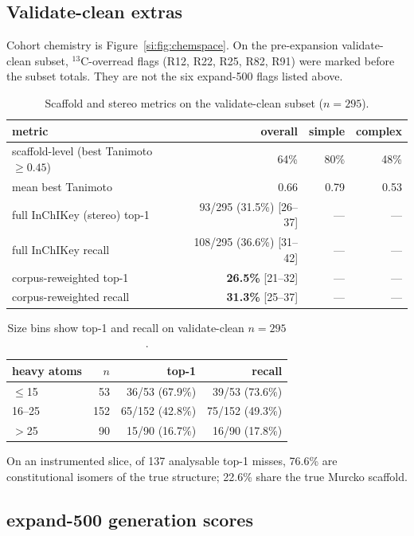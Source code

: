 \subsection{Validate-clean extras}
\label{si:extras}

Cohort chemistry is Figure~\ref{si:fig:chemspace}.
On the pre-expansion validate-clean subset, $^{13}$C-overread flags
(R12, R22, R25, R82, R91) were marked before the subset totals.
They are not the six expand-500 flags listed above.

\begin{table}[ht]
\caption{Scaffold and stereo metrics on the validate-clean subset
($n{=}295$).}
\centering
\small
\begin{tabular}{@{}lrrr@{}}
\toprule
metric & overall & simple & complex \\
\midrule
scaffold-level (best Tanimoto $\geq 0.45$) & 64\% & 80\% & 48\% \\
mean best Tanimoto & 0.66 & 0.79 & 0.53 \\
full InChIKey (stereo) top-1 & 93/295 (31.5\%) [26--37] & --- & --- \\
full InChIKey recall & 108/295 (36.6\%) [31--42] & --- & --- \\
corpus-reweighted top-1 & \textbf{26.5\%} [21--32] & --- & --- \\
corpus-reweighted recall & \textbf{31.3\%} [25--37] & --- & --- \\
\bottomrule
\end{tabular}
\end{table}

\begin{table}[ht]
\caption{Size bins show top-1 and recall on validate-clean $n{=}295$.}
\centering
\begin{tabular}{@{}lrrr@{}}
\toprule
heavy atoms & $n$ & top-1 & recall \\
\midrule
$\leq$15 & 53 & 36/53 (67.9\%) & 39/53 (73.6\%) \\
16--25 & 152 & 65/152 (42.8\%) & 75/152 (49.3\%) \\
$>$25 & 90 & 15/90 (16.7\%) & 16/90 (17.8\%) \\
\bottomrule
\end{tabular}
\end{table}

On an instrumented slice, of 137 analysable top-1 misses, 76.6\% are
constitutional isomers of the true structure; 22.6\% share
the true Murcko scaffold.
\subsection{expand-500 generation scores}
\label{si:e500}

